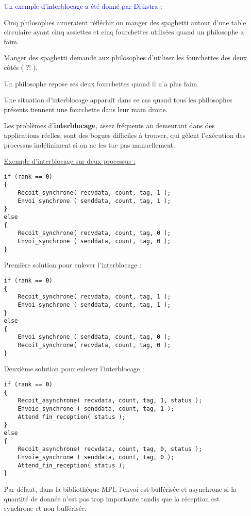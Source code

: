\documentclass[fleqn,11pt]{article}
\begin{document}
\textcolor{blue}{Un exemple d'interblocage a été donné par Dijkstra} : 

\begin{framed}
Cinq philosophes aimeraient
réfléchir ou manger des spaghetti autour d'une table circulaire ayant cinq
assiettes et cinq fourchettes utilisées quand un philosophe a faim. 

Manger des spaghetti demande aux philosophes
d'utiliser les fourchettes des deux côtés ( ?! ). 

Un philosophe repose ses
deux fourchettes quand il n'a plus faim. 

Une situation d'interblocage apparaît
dans ce cas quand tous les philosophes présents tiennent une fourchette dans
leur main droite.
\end{framed}

Les problèmes d'\textbf{interblocage}, assez fréquents au demeurant dans des
applications réelles, sont des bogues difficiles à trouver, qui gêlent
l'exécution des processus indéfiniment si on ne les tue pas manuellement.

\underline{Exemple d'interblocage sur deux processus :}

\begin{lstlisting}
if (rank == 0)
{
    Recoit_synchrone( recvdata, count, tag, 1 );
    Envoi_synchrone ( senddata, count, tag, 1 );
}
else
{
    Recoit_synchrone( recvdata, count, tag, 0 );
    Envoi_synchrone ( senddata, count, tag, 0 );
}
\end{lstlisting}

Première solution pour enlever l'interblocage :
\begin{lstlisting}
if (rank == 0)
{
    Recoit_synchrone( recvdata, count, tag, 1 );
    Envoi_synchrone ( senddata, count, tag, 1 );
}
else
{
    Envoi_synchrone ( senddata, count, tag, 0 );
    Recoit_synchrone( recvdata, count, tag, 0 );
}
\end{lstlisting}

Deuxième solution pour enlever l'interblocage :
\begin{lstlisting}
if (rank == 0)
{
    Recoit_asynchrone( recvdata, count, tag, 1, status );
    Envoie_synchrone ( senddata, count, tag, 1 );
    Attend_fin_reception( status );
}
else
{
    Recoit_asynchrone( recvdata, count, tag, 0, status );
    Envoie_synchrone ( senddata, count, tag, 0 );
    Attend_fin_reception( status );
}
\end{lstlisting}

Par défaut, dans la bibliothèque MPI, l'envoi est bufférisée et asynchrone si la quantité de donnée n'est pas trop
importante tandis que la réception est synchrone et non bufférisée.
\end{document}
